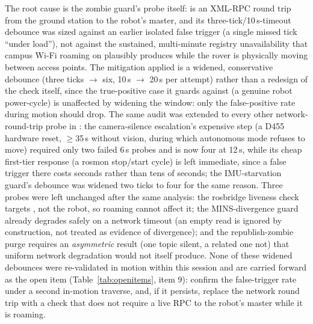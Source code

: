 The root cause is the zombie guard's probe itself:  is an
XML-RPC round trip from the ground station to the robot's master, and its
three-tick/10\,s-timeout debounce was sized against an earlier isolated
false trigger (a single missed tick ``under load''), not against the
sustained, multi-minute registry unavailability that campus Wi-Fi roaming
on  plausibly produces while the rover is physically moving
between access points. The mitigation applied is a widened, conservative
debounce (three ticks $\to$ six, 10\,s $\to$ 20\,s per attempt) rather than
a redesign of the check itself, since the true-positive case it guards
against (a genuine robot power-cycle) is unaffected by widening the window:
only the false-positive rate during motion should drop. The same audit
was extended to every other network-round-trip probe in
: the camera-silence escalation's expensive step (a
D455 hardware reset, $\ge$35\,s without vision, during which autonomous mode
refuses to move) required only two failed 6\,s probes and is now four at
12\,s, while its cheap first-tier response (a rosmon stop/start cycle) is
left immediate, since a false trigger there costs seconds rather than tens
of seconds; the IMU-starvation guard's debounce was widened two ticks to
four for the same reason. Three probes were left unchanged after the same
analysis: the rosbridge liveness check targets , not the
robot, so roaming cannot affect it; the MINS-divergence guard already
degrades safely on a network timeout (an empty read is ignored by
construction, not treated as evidence of divergence); and the republish-zombie
purge requires an \emph{asymmetric} result (one topic silent, a related one
not) that uniform network degradation would not itself produce. None of
these widened debounces were re-validated in motion within this session and
are carried forward as the open item (Table~\ref{tab:openitems}, item 9):
confirm the false-trigger rate under a second in-motion traverse, and, if it
persists, replace the network round trip with a check that does not require
a live RPC to the robot's master while it is roaming.

